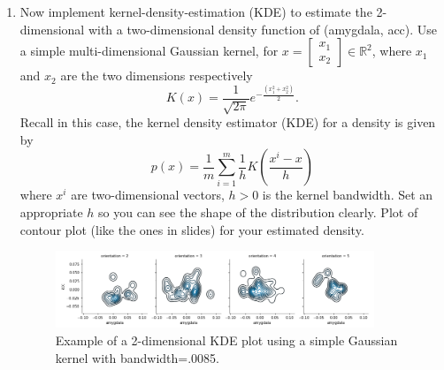\documentclass[twoside,10pt]{article}
\begin{document}
\begin{enumerate}
\begin{enumerate}
 \item Now implement kernel-density-estimation (KDE) to estimate the 2-dimensional with a two-dimensional density function of (\textsf{amygdala}, \textsf{acc}). Use a simple multi-dimensional Gaussian kernel, for $x = \begin{bmatrix}x_1\\x_2\end{bmatrix}\in \mathbb R^2$, where $x_1$ and $x_2$ are the two dimensions respectively \[K(x) = \frac{1}{\sqrt {2\pi}} e^{-\frac{(x_1^2 + x_2^2)}{2}}.\] Recall in this case, the kernel density estimator (KDE) for a density is given by
 \[
 p(x) = \frac 1 m \sum_{i=1}^m \frac 1 h
 K\left(
 \frac{x^i - x}{h}
 \right)
 \]
 where $x^i$ are two-dimensional vectors, $h >0$ is the kernel bandwidth. Set an appropriate $h$ so you can see the shape of the distribution clearly. Plot of contour plot (like the ones in slides) for your estimated density.
  
 \begin{figure}[h]
\caption{Example of a 2-dimensional KDE plot using a simple Gaussian kernel with bandwidth=.0085.  }
\centering
\includegraphics[width=0.9\textwidth]{1_b.png}
\end{figure}
 
 
  

\end{enumerate}
\end{enumerate}
\end{document}
